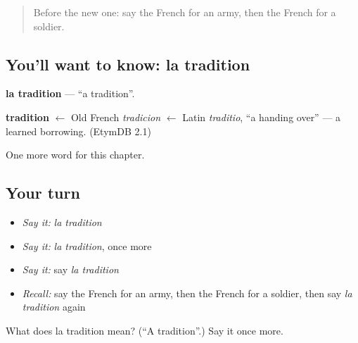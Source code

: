 \begin{quote}
Before the new one: say the French for an army, then the French for a soldier.
\end{quote}

\subsection*{You'll want to know: la tradition}
\textbf{la tradition} — \textquotedblleft{}a tradition\textquotedblright{}.

\begin{cousinweb}
\textbf{tradition} $\leftarrow$ Old French \emph{tradicion} $\leftarrow$ Latin \emph{traditio}, \textquotedblleft{}a handing over\textquotedblright{} — a learned borrowing. (EtymDB 2.1)
\end{cousinweb}

\begin{grammarlens}[title={What you've built}]
One more word for this chapter.
\end{grammarlens}

\subsection*{Your turn}
\begin{itemize}
\raggedright
  \item \emph{Say it:} \emph{la tradition}
  \item \emph{Say it:} \emph{la tradition}, once more
  \item \emph{Say it:} say \emph{la tradition}
  \item \emph{Recall:} say the French for an army, then the French for a soldier, then say \emph{la tradition} again
\end{itemize}

\begin{tcolorbox}[breakable,colback=teal!4,colframe=teal!35!black,title={Before you move on}]
What does la tradition mean? (\textquotedblleft{}A tradition\textquotedblright{}.) Say it once more.
\end{tcolorbox}
